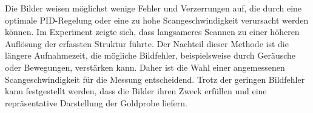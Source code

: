 Die Bilder weisen möglichst wenige Fehler und Verzerrungen auf, die durch eine optimale PID-Regelung oder eine zu hohe Scangeschwindigkeit verursacht werden können. Im Experiment zeigte sich, dass langsameres Scannen zu einer höheren Auflösung der erfassten Struktur führte. Der Nachteil dieser Methode ist die längere Aufnahmezeit, die mögliche Bildfehler, beispielsweise durch Geräusche oder Bewegungen, verstärken kann. Daher ist die Wahl einer angemessenen Scangeschwindigkeit für die Messung entscheidend. Trotz der geringen Bildfehler kann festgestellt werden, dass die Bilder ihren Zweck erfüllen und eine repräsentative Darstellung der Goldprobe liefern.